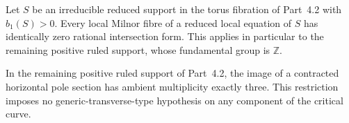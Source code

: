 
\begin{proposition}[P4.51]\hypertarget{tag-02XQ}{}\label{night:P4.51}\label{stmt:P4.51}


Let $S$ be an irreducible reduced support in the torus
fibration of Part~4.2 with $b_1(S)>0$. Every local
Milnor fibre of a reduced local equation of $S$ has
identically zero rational intersection form. This applies
in particular to the remaining positive ruled support,
whose fundamental group is $\mathbb Z$.
\end{proposition}

\begin{proposition}[P4.52]\hypertarget{tag-02XR}{}\label{night:P4.52}\label{stmt:P4.52}


In the remaining positive ruled support of Part~4.2,
the image of a contracted horizontal pole section has
ambient multiplicity exactly three. This restriction
imposes no generic-transverse-type hypothesis on
any component of the critical curve.
\end{proposition}

